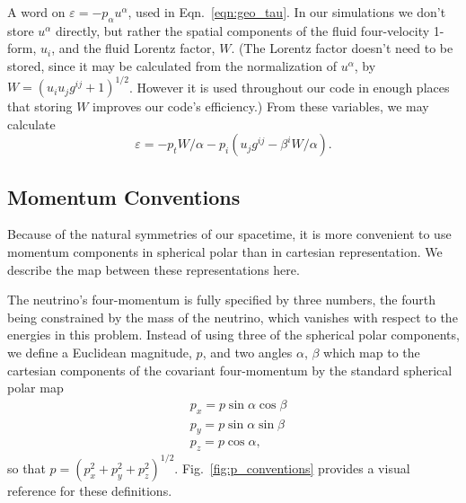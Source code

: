 A word on $\varepsilon=-p_\alpha u^\alpha$, used in Eqn.~\ref{eqn:geo_tau}.
In our simulations we don't store $u^\alpha$ directly, but rather the spatial
components of the fluid four-velocity 1-form, $u_i$, and the fluid Lorentz
factor, $W$. (The Lorentz factor doesn't need to be stored, since it may
be calculated from the normalization of $u^\alpha$, by
$W=(u_iu_jg^{ij}+1)^{1/2}$. However it is used throughout our code in enough
places that storing $W$ improves our code's efficiency.)
From these variables, we may calculate
\begin{equation}
  \varepsilon = -p_t W/\alpha -p_i(u_j g^{ij}-\beta^i W/\alpha).
\end{equation}

\subsection{Momentum Conventions}
\label{ssec:p_conventions}
Because of the natural symmetries of our spacetime, it is more convenient to use
momentum components in spherical polar than in cartesian representation. We
describe the map between these representations here.

The neutrino's four-momentum is fully specified by three numbers, the fourth being
constrained by the mass of the neutrino, which vanishes with respect to the
energies in this problem. Instead of using three of the spherical polar
components, we define a Euclidean magnitude, $p$, and two angles $\alpha$,
$\beta$ which map to the cartesian components of the covariant four-momentum by
the standard spherical polar map
\begin{align}
  &p_x = p\sin\alpha\cos\beta \\
  &p_y = p\sin\alpha\sin\beta \\
  &p_z = p\cos\alpha,
\end{align}
so that $p = (p_x^2+p_y^2+p_z^2)^{1/2}$.
Fig.~\ref{fig:p_conventions} provides a visual reference for these definitions.

